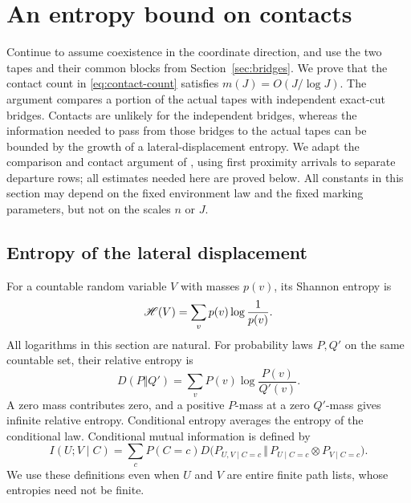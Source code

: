 \section{An entropy bound on contacts}\label{sec:entropy}

Continue to assume coexistence in the coordinate direction, and use the two
tapes and their common blocks from Section~\ref{sec:bridges}.  We prove that
the contact count in \eqref{eq:contact-count} satisfies
\(m(J)=O(J/\log J)\).  The argument compares a portion of the actual tapes
with independent exact-cut bridges.  Contacts are unlikely for the independent
bridges, whereas the information needed to pass from those bridges to the
actual tapes can be bounded by the growth of a lateral-displacement entropy.
We adapt the comparison and contact argument of
\cite[Proposition~5.1 and Lemmas~5.2--5.3]{OpenAI2026}, using first proximity
arrivals to separate departure rows; all estimates needed here are proved
below.
All constants in this section may depend on the fixed environment law and
the fixed marking parameters, but not on the scales \(n\) or \(J\).

\subsection{Entropy of the lateral displacement}

For a countable random variable \(V\) with masses \(p(v)\), its Shannon
entropy \cite{Shannon1948} is
\[
 \mathscr H(V)=\sum_v p(v)\log\frac1{p(v)}.
\]
All logarithms in this section are natural.  For probability laws \(P,Q'\)
on the same countable set, their relative entropy
\cite{KullbackLeibler1951} is
\[
 D(P\Vert Q')=\sum_v P(v)\log\frac{P(v)}{Q'(v)}.
\]
A zero mass contributes zero, and a positive \(P\)-mass at a zero
\(Q'\)-mass gives infinite relative entropy.  Conditional entropy averages
the entropy of the conditional law.  Conditional mutual information is
defined by
\[
 I(U;V\mid C)
 =\sum_c P(C=c)
 D\bigl(P_{U,V\mid C=c}\,\Vert\,
          P_{U\mid C=c}\otimes P_{V\mid C=c}\bigr).
\]
We use these definitions even when \(U\) and \(V\) are entire finite path
lists, whose entropies need not be finite.

